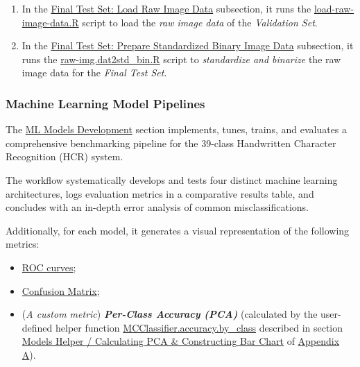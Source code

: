 \documentclass[
]{report}
\providecommand{\tightlist}{%
  \setlength{\itemsep}{0pt}\setlength{\parskip}{0pt}}
\begin{document}
\begin{enumerate}
  \begin{enumerate}
  \def\labelenumii{\arabic{enumii}.}
  \tightlist
  \item
    In the \href{https://github.com/AzKurban-edX-DS/edx.capstone.choose-your-own/blob/main/r/index.R\#L114-L132}{Final Test Set: Load Raw Image Data} subsection, it runs the \href{https://github.com/AzKurban-edX-DS/edx.capstone.choose-your-own/blob/main/r/support-scripts/load-raw-image-data.R}{load-raw-image-data.R} script to load the \emph{raw image data} of the \emph{Validation Set}.
  \item
    In the \href{https://github.com/AzKurban-edX-DS/edx.capstone.choose-your-own/blob/main/r/index.R\#L133-L160}{Final Test Set: Prepare Standardized Binary Image Data} subsection, it runs the \href{https://github.com/AzKurban-edX-DS/edx.capstone.choose-your-own/blob/main/r/support-scripts/raw-img.dat2std_bin.R}{raw-img.dat2std\_bin.R} script to \emph{standardize and binarize} the raw image data for the \emph{Final Test Set}.
  \end{enumerate}
\end{enumerate}

\subsubsection{Machine Learning Model Pipelines}\label{machine-learning-model-pipelines}

The \href{https://github.com/AzKurban-edX-DS/edx.capstone.choose-your-own/blob/main/r/index.R\#L161-L1066}{ML Models Development} section implements, tunes, trains, and evaluates a comprehensive benchmarking pipeline for the 39-class Handwritten Character Recognition (HCR) system.

The workflow systematically develops and tests four distinct machine learning architectures, logs evaluation metrics in a comparative results table, and concludes with an in-depth error analysis of common misclassifications.

Additionally, for each model, it generates a visual representation of the following metrics:

\begin{itemize}
\tightlist
\item
  \href{https://developers.google.com/machine-learning/crash-course/classification/roc-and-auc\#:~:text=Precision\%2Drecall\%20curves\%20are\%20created,x\%2Daxis\%20across\%20all\%20thresholds.}{ROC curves};
\item
  \href{https://rafalab.dfci.harvard.edu/dsbook-part-2/ml/evaluation-metrics.html\#the-confusion-matrix}{Confusion Matrix};
\item
  (\emph{A custom metric}) \textbf{\emph{Per-Class Accuracy (PCA)}} (calculated by the user-defined helper function \hyperref[func.MCClassifier.accuracy.by_class]{MCClassifier.accuracy.by\_class} described in section \hyperref[appndx_a.mh.calc_pca.bar_chart]{Models Helper / Calculating PCA \& Constructing Bar Chart} of \hyperref[appndx_a]{Appendix A}).
\end{itemize}
\end{document}
